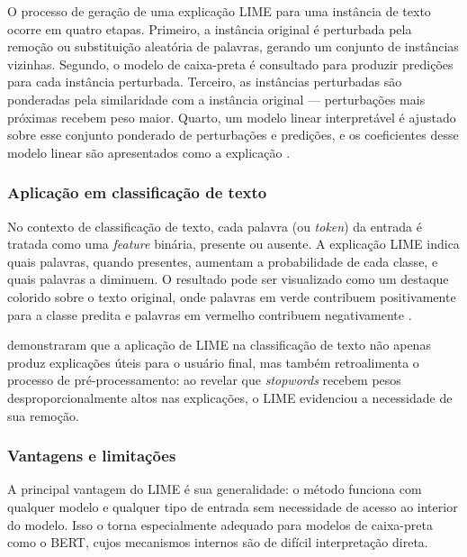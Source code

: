 \documentclass[
    12pt,                %
    openright,           %
    oneside,             %
    a4paper,             %
    english,             %
    brazil               %
]{abntex2}
\begin{document}
O processo de geração de uma explicação LIME para uma instância de texto ocorre em quatro etapas. Primeiro, a instância original é perturbada pela remoção ou substituição aleatória de palavras, gerando um conjunto de instâncias vizinhas. Segundo, o modelo de caixa-preta é consultado para produzir predições para cada instância perturbada. Terceiro, as instâncias perturbadas são ponderadas pela similaridade com a instância original — perturbações mais próximas recebem peso maior. Quarto, um modelo linear interpretável é ajustado sobre esse conjunto ponderado de perturbações e predições, e os coeficientes desse modelo linear são apresentados como a explicação \cite{ribeiro2016}.

\subsubsection{Aplicação em classificação de texto}
\label{subsubsec:lime_texto}

No contexto de classificação de texto, cada palavra (ou \textit{token}) da entrada é tratada como uma \textit{feature} binária, presente ou ausente. A explicação LIME indica quais palavras, quando presentes, aumentam a probabilidade de cada classe, e quais palavras a diminuem. O resultado pode ser visualizado como um destaque colorido sobre o texto original, onde palavras em verde contribuem positivamente para a classe predita e palavras em vermelho contribuem negativamente \cite{mustafa2025}.

 demonstraram que a aplicação de LIME na classificação de texto não apenas produz explicações úteis para o usuário final, mas também retroalimenta o processo de pré-processamento: ao revelar que \textit{stopwords} recebem pesos desproporcionalmente altos nas explicações, o LIME evidenciou a necessidade de sua remoção.

\subsubsection{Vantagens e limitações}
\label{subsubsec:lime_limitacoes}

A principal vantagem do LIME é sua generalidade: o método funciona com qualquer modelo e qualquer tipo de entrada sem necessidade de acesso ao interior do modelo. Isso o torna especialmente adequado para modelos de caixa-preta como o BERT, cujos mecanismos internos são de difícil interpretação direta.
\end{document}
